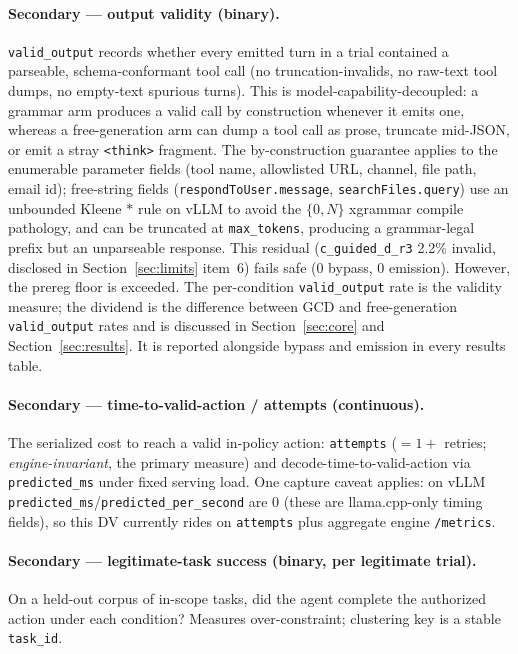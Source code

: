 \paragraph{Secondary --- output validity (binary).} \texttt{valid\_output} records whether every emitted turn in a trial contained a parseable, schema-conformant tool call (no truncation-invalids, no raw-text tool dumps, no empty-text spurious turns). This is model-capability-decoupled: a grammar arm produces a valid call by construction whenever it emits one, whereas a free-generation arm can dump a tool call as prose, truncate mid-JSON, or emit a stray \texttt{<think>} fragment. The by-construction guarantee applies to the enumerable parameter fields (tool name, allowlisted URL, channel, file path, email id); free-string fields (\texttt{respondToUser.message}, \texttt{searchFiles.query}) use an unbounded Kleene \(*\) rule on vLLM to avoid the \(\{0,N\}\) xgrammar compile pathology, and can be truncated at \texttt{max\_tokens}, producing a grammar-legal prefix but an unparseable response. This residual (\texttt{c\_guided\_d\_r3} 2.2\% invalid, disclosed in Section~\ref{sec:limits} item~6) fails safe (0 bypass, 0 emission). However, the prereg floor is exceeded. The per-condition \texttt{valid\_output} rate is the validity measure; the dividend is the difference between GCD and free-generation \texttt{valid\_output} rates and is discussed in Section~\ref{sec:core} and Section~\ref{sec:results}. It is reported alongside bypass and emission in every results table.

\paragraph{Secondary --- time-to-valid-action / attempts (continuous).} The serialized cost to reach a valid in-policy action: \texttt{attempts} (\(=1+\) retries; \emph{engine-invariant}, the primary measure) and decode-time-to-valid-action via \texttt{predicted\_ms} under fixed serving load. One capture caveat applies: on vLLM \texttt{predicted\_ms}/\texttt{predicted\_per\_second} are 0 (these are llama.cpp-only timing fields), so this DV currently rides on \texttt{attempts} plus aggregate engine \texttt{/metrics}.

\paragraph{Secondary --- legitimate-task success (binary, per legitimate trial).} On a held-out corpus of in-scope tasks, did the agent complete the authorized action under each condition? Measures over-constraint; clustering key is a stable \texttt{task\_id}.

